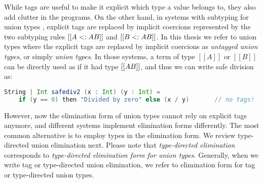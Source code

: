 



While tags are useful to make it explicit which type a value belongs to, they
also add clutter in the programs. On the other hand, in systems with subtyping for union types
\citep{dunfield2014elaborating,pierce1991programming,muehlboeck2018empowering},
explicit tags are replaced by implicit coercions represented by the two
subtyping rules $[[A <: A \/ B]]$ and $[[B <: A \/ B]]$. In this thesis
we refer to union types where the explicit tags are replaced by implicit coercions
as \textit{untagged union types}, or simply \textit{union types}. In those systems,
a term of type $[[A]]$ or $[[B]]$ can be directly used as if it had type $[[A \/
B]]$, and thus we can write safe division as:

\begin{lstlisting}[language=Scala]
  String | Int safediv2 (x : Int) (y : Int) =
    if (y == 0) then "Divided by zero" else (x / y)       // no tags!
\end{lstlisting}

\noindent
However, now the elimination form of union types cannot rely on explicit tags anymore, and
different systems implement elimination forms differently.
The most common alternative is to employ types in the elimination form.
We review type-directed union elimination next.
Please note that
\emph{type-directed elimination} corresponds to
\emph{type-directed elimination form for union types}.
Generally, when we write tag or type-directed union elimination, we refer to
elimination form for tag or type-directed union types.

